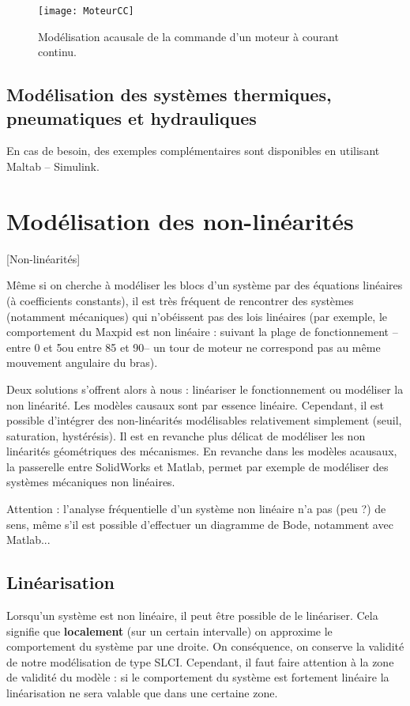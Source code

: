 \begin{figure}[!h]
\texttt{[image: MoteurCC]}

\caption{Modélisation acausale de la commande d'un moteur à courant continu.}
\end{figure}


\subsection{Modélisation des systèmes thermiques, pneumatiques et hydrauliques}
En cas de besoin, des exemples complémentaires sont disponibles en utilisant Maltab -- Simulink.


\section{Modélisation des non-linéarités}[Non-linéarités]

Même si on cherche à modéliser les blocs d'un système par des équations linéaires (à coefficients constants), il est très fréquent de rencontrer des systèmes (notamment mécaniques) qui n'obéissent pas des lois linéaires (par exemple, le comportement du Maxpid est non linéaire : suivant la plage de fonctionnement -- entre 0 et 5\textdegree ou entre 85 et 90\textdegree -- un tour de moteur ne correspond pas au même mouvement angulaire du bras). 

Deux solutions s'offrent alors à nous : linéariser le fonctionnement ou modéliser la non linéarité. 
Les modèles causaux sont par essence linéaire. Cependant, il est possible d'intégrer des non-linéarités modélisables relativement simplement (seuil, saturation, hystérésis). Il est en revanche plus délicat de modéliser les non linéarités géométriques des mécanismes. 
En revanche dans les modèles acausaux, la passerelle entre SolidWorks et Matlab, permet par exemple de modéliser des systèmes mécaniques non linéaires.

\begin{warn}
Attention : l'analyse fréquentielle d'un système non linéaire n'a pas (peu ?) de sens, même s'il est possible d'effectuer un diagramme de Bode, notamment avec Matlab...
\end{warn}

\subsection{Linéarisation}
Lorsqu'un système est non linéaire, il peut être possible de le linéariser. Cela signifie que \textbf{localement} (sur un certain intervalle) on approxime le comportement du système par une droite. On conséquence, on conserve la validité de notre modélisation de type SLCI. Cependant, il faut faire attention à la zone de validité du modèle : si le comportement du système est fortement linéaire la linéarisation ne sera valable que dans une certaine zone.


